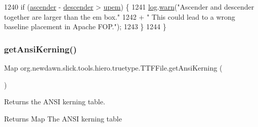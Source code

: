 \begin{DoxyCode}
1240         \textcolor{keywordflow}{if} (\mbox{\hyperlink{classorg_1_1newdawn_1_1slick_1_1tools_1_1hiero_1_1truetype_1_1_t_t_f_file_ac6fe3f7fef9f5e496d628413445decc7}{ascender}} - \mbox{\hyperlink{classorg_1_1newdawn_1_1slick_1_1tools_1_1hiero_1_1truetype_1_1_t_t_f_file_a8e8376e5186884a347d6f1bbd122ab86}{descender}} > \mbox{\hyperlink{classorg_1_1newdawn_1_1slick_1_1tools_1_1hiero_1_1truetype_1_1_t_t_f_file_a8250ffa3465ce98f553e94c1dec0287f}{upem}}) \{
1241             \mbox{\hyperlink{classorg_1_1newdawn_1_1slick_1_1tools_1_1hiero_1_1truetype_1_1_t_t_f_file_ae6acbd4aea68fd8cf15305aa535993f4}{log}}.\mbox{\hyperlink{classorg_1_1newdawn_1_1slick_1_1tools_1_1hiero_1_1truetype_1_1_log_aa0cb9dec081b4bcfe0d361f8d0ada0f7}{warn}}(\textcolor{stringliteral}{"Ascender and descender together are larger than the em box."}
1242                     + \textcolor{stringliteral}{" This could lead to a wrong baseline placement in Apache FOP."});
1243         \}
1244     \}
\end{DoxyCode}
\mbox{\label{classorg_1_1newdawn_1_1slick_1_1tools_1_1hiero_1_1truetype_1_1_t_t_f_file_a5a235e92d8e8f25d7d1ee8ab6b88cb80}} 
\subsubsection{\texorpdfstring{get\+Ansi\+Kerning()}{getAnsiKerning()}}
{\footnotesize\ttfamily Map org.\+newdawn.\+slick.\+tools.\+hiero.\+truetype.\+T\+T\+F\+File.\+get\+Ansi\+Kerning (\begin{DoxyParamCaption}{ }\end{DoxyParamCaption})\hspace{0.3cm}{\ttfamily [inline]}}

Returns the A\+N\+SI kerning table. \begin{DoxyReturn}{Returns}
Map The A\+N\+SI kerning table 
\end{DoxyReturn}

